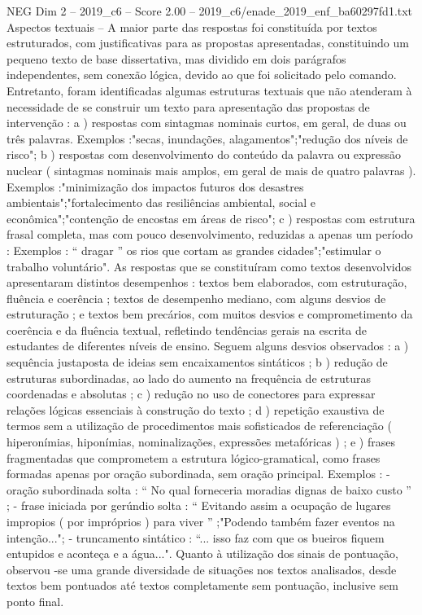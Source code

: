 \begin{textsample}{NEG Dim 2 – 2019\_c6 – Score 2.00 – 2019\_c6/enade\_2019\_enf\_ba60297fd1.txt}
Aspectos textuais – A maior parte das respostas foi constituída por textos estruturados, com justificativas para as propostas apresentadas, constituindo um pequeno texto de base dissertativa, mas dividido em dois parágrafos independentes, sem conexão lógica, devido ao que foi solicitado pelo comando.
Entretanto, foram identificadas algumas estruturas textuais que não atenderam à necessidade de se construir um texto para apresentação das propostas de intervenção : a ) respostas com sintagmas nominais curtos, em geral, de duas ou três palavras.
Exemplos :"secas, inundações, alagamentos";"redução dos níveis de risco"; b ) respostas com desenvolvimento do conteúdo da palavra ou expressão nuclear ( sintagmas nominais mais amplos, em geral de mais de quatro palavras ).
Exemplos :"minimização dos impactos futuros dos desastres ambientais";"fortalecimento das resiliências ambiental, social e econômica";"contenção de encostas em áreas de risco"; c ) respostas com estrutura frasal completa, mas com pouco desenvolvimento, reduzidas a apenas um período : Exemplos : “ dragar ” os rios que cortam as grandes cidades";"estimular o trabalho voluntário".
As respostas que se constituíram como textos desenvolvidos apresentaram distintos desempenhos : textos bem elaborados, com estruturação, fluência e coerência ; textos de desempenho mediano, com alguns desvios de estruturação ; e textos bem precários, com muitos desvios e comprometimento da coerência e da fluência textual, refletindo tendências gerais na escrita de estudantes de diferentes níveis de ensino.
Seguem alguns desvios observados : a ) sequência justaposta de ideias sem encaixamentos sintáticos ; b ) redução de estruturas subordinadas, ao lado do aumento na frequência de estruturas coordenadas e absolutas ; c ) redução no uso de conectores para expressar relações lógicas essenciais à construção do texto ; d ) repetição exaustiva de termos sem a utilização de procedimentos mais sofisticados de referenciação ( hiperonímias, hiponímias, nominalizações, expressões metafóricas ) ; e ) frases fragmentadas que comprometem a estrutura lógico-gramatical, como frases formadas apenas por oração subordinada, sem oração principal.
Exemplos : - oração subordinada solta : “ No qual forneceria moradias dignas de baixo custo ” ; - frase iniciada por gerúndio solta : “ Evitando assim a ocupação de lugares impropios ( por impróprios ) para viver ” ;"Podendo também fazer eventos na intenção..."; - truncamento sintático : “... isso faz com que os bueiros fiquem entupidos e aconteça e a água...".
Quanto à utilização dos sinais de pontuação, observou -se uma grande diversidade de situações nos textos analisados, desde textos bem pontuados até textos completamente sem pontuação, inclusive sem ponto final.

\end{textsample}
